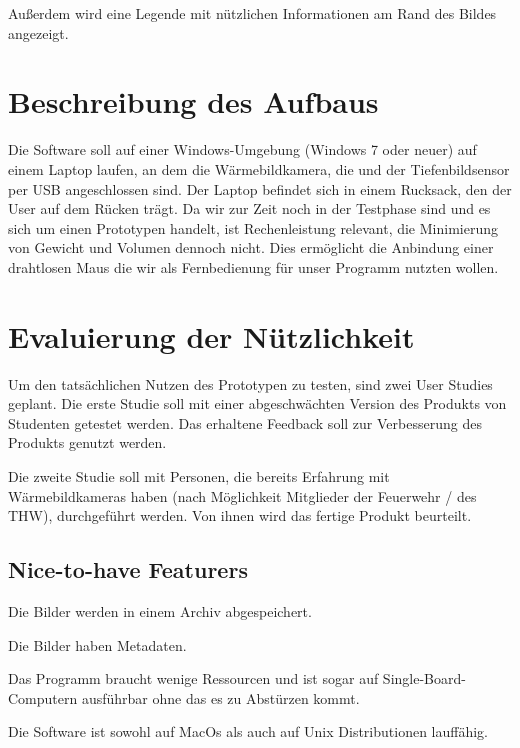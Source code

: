 Außerdem wird eine Legende mit nützlichen Informationen am Rand des Bildes angezeigt.

\section{Beschreibung des Aufbaus}
Die Software soll auf einer Windows-Umgebung (Windows 7 oder neuer) auf einem Laptop laufen, an dem die Wärmebildkamera, die \meta und der Tiefenbildsensor per USB angeschlossen sind.
Der Laptop befindet sich in einem Rucksack, den der User auf dem Rücken trägt.
Da wir zur Zeit noch in der Testphase sind und es sich um einen Prototypen handelt, ist Rechenleistung relevant, die Minimierung von Gewicht und Volumen dennoch nicht.
Dies ermöglicht die Anbindung einer drahtlosen Maus die wir als Fernbedienung für unser Programm nutzten wollen.

\section{Evaluierung der Nützlichkeit}
Um den tatsächlichen Nutzen des Prototypen zu testen, sind zwei User Studies geplant.
Die erste Studie soll mit einer abgeschwächten Version des Produkts von Studenten getestet werden.
Das erhaltene Feedback soll zur Verbesserung des Produkts genutzt werden.

Die zweite Studie soll mit Personen, die bereits Erfahrung mit Wärmebildkameras haben (nach Möglichkeit Mitglieder der Feuerwehr / des THW), durchgeführt werden.
Von ihnen wird das fertige Produkt beurteilt.

\subsection{Nice-to-have Featurers}
Die Bilder werden in einem Archiv abgespeichert.

Die Bilder haben Metadaten.

Das Programm braucht wenige Ressourcen und ist sogar auf Single-Board-Computern ausführbar ohne das es zu Abstürzen kommt.

Die Software ist sowohl auf MacOs als auch auf Unix Distributionen lauffähig.


